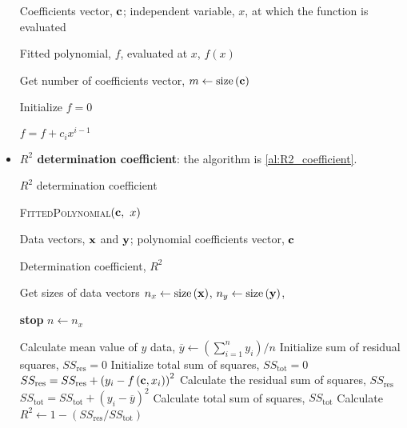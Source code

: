\begin{itemize}
\begin{algorithm}
\begin{algorithmic}[1]
                \Input Coefficients vector, $\boldsymbol{\mathrm{c}}$;
                independent variable, $x$, at which the function is evaluated

                \Output Fitted polynomial, $f$, evaluated at $x$, $f\left( x \right)$

                \State Get number of coefficients vector, 
                $m \leftarrow \mathrm{size}\left( \boldsymbol{\mathrm{c}} \right)$

                \State Initialize $f = 0$

                    \State $f = f + c_i x^{i - 1}$
                \EndFor

                \EndFunction
            \end{algorithmic}
        \end{algorithm}
    \item \textbf{$R^{2}$ determination coefficient}: the algorithm is \cref{al:R2_coefficient}.
        \begin{algorithm}
            \caption{$R^{2}$ determination coefficient}\label{al:R2_coefficient}
            \begin{algorithmic}[1]

                \Require \textsc{FittedPolynomial}$\left( \boldsymbol{\mathrm{c}},\ x \right)$

                \Input Data vectors, $\boldsymbol{\mathrm{x}}$ and $\boldsymbol{\mathrm{y}}$;
                polynomial coefficients vector, $\boldsymbol{\mathrm{c}}$

                \Output Determination coefficient, $R^2$

                \State Get sizes of data vectors
                $n_x \leftarrow \mathrm{size}\left( \boldsymbol{\mathrm{x}} \right)$,
                $n_y \leftarrow \mathrm{size}\left( \boldsymbol{\mathrm{y}} \right)$,

                    \textbf{stop}
                \Else
                    $n \leftarrow n_x$
                \EndIf

                \State Calculate mean value of $y$ data,
                $\overline{y} \leftarrow \left( \sum_{i = 1}^{n} y_i \right) / n$
                \State Initialize sum of residual squares, $SS_{\text{res}} = 0$
                \State Initialize total sum of squares, $SS_{\text{tot}} = 0$
                    \State $SS_{\text{res}} = SS_{\text{res}} + \left( y_i - f\left( \boldsymbol{\mathrm{c}}, x_i \right) \right)^{2}$
                    \Comment Calculate the residual sum of squares, $SS_{\text{res}}$
                    \State $SS_{\text{tot}} = SS_{\text{tot}} + \left( y_i - \overline{y} \right)^{2}$
                    \Comment Calculate total sum of squares, $SS_{\text{tot}}$
                \EndFor
                \State Calculate $R^2 \leftarrow 1 - \left( SS_{\text{res}} / SS_{\text{tot}} \right)$
                \EndProcedure
            \end{algorithmic}
        \end{algorithm}
\end{itemize}

